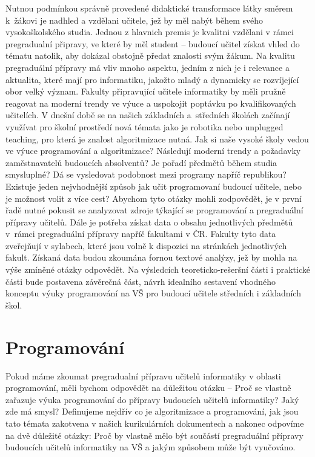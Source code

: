 \documentclass[FP,DP]{tulthesis}
\begin{document}
Nutnou podmínkou správně provedené didaktické transformace látky směrem  k~žákovi je nadhled a vzdělani učitele, jež by měl nabýt během svého vysokoškolského studia. Jednou z hlavnich premis je kvalitni vzdělani v rámci pregradualní připravy, ve které by měl student -- budoucí učitel získat vhled do tématu natolik, aby dokázal obstojně předat znalosti svým žákum. Na kvalitu pregraduální přípravy má vliv mnoho aspektu, jedním z nich je i relevance a aktualita, které mají pro informatiku, jakožto mladý a dynamicky se rozvíjející obor velký význam. Fakulty připravující učitele informatiky by měli pružně reagovat na moderní trendy ve výuce a uspokojit poptávku po kvalifikovaných učitelích.  V dnešní době se na našich základních a~středních školách začínají využívat pro školní prostředí nová témata jako je robotika nebo unplugged teaching, pro která je znalost algoritmizace nutná. Jak si naše vysoké školy vedou ve výuce programování a algoritmizace? Následují moderní trendy a požadavky zaměstnavatelů budoucích absolventů? Je pořadí předmětů během studia smysluplné? Dá se vysledovat podobnost mezi programy napříč republikou? Existuje  jeden nejvhodnější způsob jak učit programovaní budoucí učitele, nebo je možnost volit z více cest? Abychom tyto otázky mohli zodpovědět, je v první řadě nutné pokusit se analyzovat zdroje týkající se programování a pregraduální přípravy učitelů. Dále je potřeba získat data o obsahu jednotlivých předmětů v~rámci pregraduální přípravy napříč fakultami v ČR. Fakulty tyto data zveřejňují v sylabech, které jsou volně k dispozici na stránkách jednotlivých fakult. Získaná data budou zkoumána fornou textové analýzy, jež by mohla na výše zmíněné otázky odpovědět. Na výsledcích teoreticko-rešeršní části i praktické části bude postavena závěrečná část, návrh idealního sestavení vhodného konceptu výuky programování na VŠ pro budoucí učitele středních i základních škol.
\clearpage
\listoftodos
\chapter{Programování}
Pokud máme zkoumat pregradualní přípravu učitelů informatiky v oblasti programování, měli bychom odpovědět na důležitou otázku -- Proč se vlastně zařazuje výuka programování do přípravy budoucích učitelů informatiky? Jaký zde má smysl? Definujeme nejdřív co je algoritmizace a programování, jak jsou tato témata zakotvena v našich kurikulárních dokumentech a nakonec odpovíme na dvě důležité otázky: Proč by vlastně mělo být součástí pregraduální přípravy budoucích učitelů informatiky na VŠ a jakým způsobem může být vyučováno.
\end{document}
